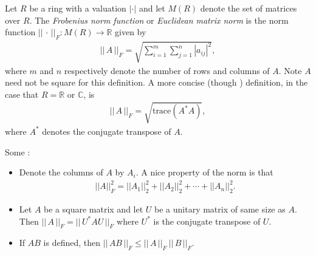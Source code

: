 \documentclass[12pt]{article}
\newcommand{\mb}{\mathbb}
\newcommand{\ra}{\rightarrow}
\newcommand{\R}{\mb{R}}
\newcommand{\<}{\langle}
\renewcommand{\>}{\rangle}
\begin{document}
Let $R$ be a ring with a valuation $|\cdot|$ and let $M(R)$ denote the set of matrices over $R$.  The \emph{Frobenius norm function} or \emph{Euclidean matrix norm} is the norm function $||\,\cdot\,||_F:M(R)\ra\R$ given by
\begin{align*}
||\,A\,||_F = \sqrt{\sum_{i=1}^m\sum_{j=1}^n|a_{ij}|^2},
\end{align*}
where $m$ and $n$ respectively denote the number of rows and columns of $A$.  Note $A$ need not be square for this definition.  A more concise (though ) definition, in the case that $R=\mathbb{R}$ or $\mathbb{C}$, is
\begin{align*}
||\,A\,||_F = \sqrt{\textrm{trace}(A^*A)},
\end{align*}
where $A^*$ denotes the conjugate transpose of $A$.

Some :
\begin{itemize}
\item 
Denote the columns of $A$ by $A_i$.  A nice property of the norm is that
\begin{align*}
||A||_F^2=||A_1||_2^2+||A_2||_2^2+\cdots+||A_n||_2^2.
\end{align*}
\item Let $A$ be a square matrix and let $U$ be a unitary matrix
 of same size as $A$. Then $||\,A\,||_F = ||\,U^\ast A U\,||_F$
 where $U^\ast$ is the conjugate transpose of $U$. 
\item If $AB$ is defined, then $||\,A B\,||_F \le ||\,A\,||_F\ ||\,B\,||_F$.
\end{itemize}
\end{document}
